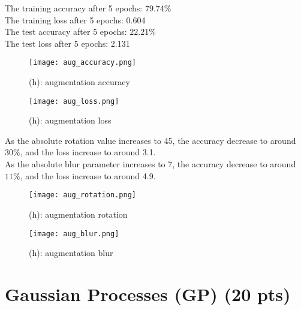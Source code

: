 \documentclass{article}
\begin{document}
The training accuracy after 5 epochs: $79.74\%$\\
The training loss after 5 epochs: 0.604\\
The test accuracy after 5 epochs: $22.21\%$\\
The test loss after 5 epochs: 2.131\\
\begin{figure}[hbt]
	\begin{minipage}[b]{.5\textwidth}\centering
		\texttt{[image: aug\_accuracy.png]}
		\caption{(h): augmentation accuracy}\label{aug_accuracy}
	\end{minipage}
	\begin{minipage}[b]{.5\textwidth}\centering
		\texttt{[image: aug\_loss.png]}
		\caption{(h): augmentation loss}\label{aug_loss}
	\end{minipage}
\end{figure}
As the absolute rotation value increases to 45, the accuracy decrease to around $30\%$, and the loss increase to around 3.1.\\
As the absolute blur parameter increases to 7, the accuracy decrease to around $11\%$, and the loss increase to around 4.9.\\
\begin{figure}[hbt]
	\begin{minipage}[b]{.5\textwidth}\centering
		\texttt{[image: aug\_rotation.png]}
		\caption{(h): augmentation rotation}\label{aug_rotation}
	\end{minipage}
	\begin{minipage}[b]{.5\textwidth}\centering
		\texttt{[image: aug\_blur.png]}
		\caption{(h): augmentation blur}\label{aug_blur}
	\end{minipage}
\end{figure}

\section{Gaussian Processes (GP) (20 pts)}
\end{document}
